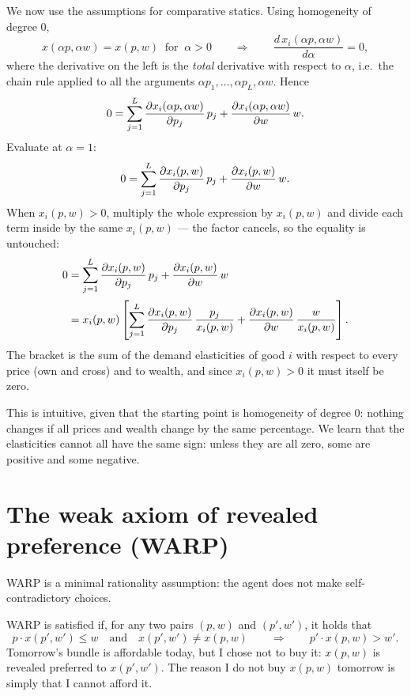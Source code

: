 \documentclass[11pt]{article}
\begin{document}
We now use the assumptions for comparative statics. Using homogeneity of degree 0,
\[ x(\alpha p,\alpha w)=x(p,w)\ \text{ for }\ \alpha>0
   \qquad\Longrightarrow\qquad
   \frac{d\,x_i(\alpha p,\alpha w)}{d\alpha}=0, \]
where the derivative on the left is the \emph{total} derivative with respect to
$\alpha$, i.e.\ the chain rule applied to all the arguments
$\alpha p_1,\dots,\alpha p_L,\alpha w$. Hence
\[ 0=\sum_{j=1}^{L}\frac{\partial x_i(\alpha p,\alpha w)}{\partial p_j}\,p_j
     +\frac{\partial x_i(\alpha p,\alpha w)}{\partial w}\,w . \]
Evaluate at $\alpha=1$:
\[ 0=\sum_{j=1}^{L}\frac{\partial x_i(p,w)}{\partial p_j}\,p_j
     +\frac{\partial x_i(p,w)}{\partial w}\,w . \]
When $x_i(p,w)>0$, multiply the whole expression by $x_i(p,w)$ and divide each term
inside by the same $x_i(p,w)$ --- the factor cancels, so the equality is untouched:
\[
\begin{aligned}
  0&=\sum_{j=1}^{L}\frac{\partial x_i(p,w)}{\partial p_j}\,p_j
      +\frac{\partial x_i(p,w)}{\partial w}\,w\\[2pt]
   &=x_i(p,w)\left[\sum_{j=1}^{L}\frac{\partial x_i(p,w)}{\partial p_j}\,\frac{p_j}{x_i(p,w)}
      +\frac{\partial x_i(p,w)}{\partial w}\,\frac{w}{x_i(p,w)}\right].
\end{aligned}
\]
The bracket is the sum of the demand elasticities of good $i$ with respect to every
price (own and cross) and to wealth, and since $x_i(p,w)>0$ it must itself be zero.

This is intuitive, given that the starting point is homogeneity of degree 0:
nothing changes if all prices and wealth change by the same percentage. We learn
that the elasticities cannot all have the same sign: unless they are all zero, some
are positive and some negative.

\section{The weak axiom of revealed preference (WARP)}

WARP is a minimal rationality assumption: the agent does not make
self-contradictory choices.

WARP is satisfied if, for any two pairs $(p,w)$ and $(p',w')$, it holds that
\[ p\cdot x(p',w')\le w
   \quad\text{and}\quad x(p',w')\ne x(p,w)
   \qquad\Longrightarrow\qquad
   p'\cdot x(p,w)>w' . \]
Tomorrow's bundle is affordable today, but I chose not to buy it: $x(p,w)$ is
revealed preferred to $x(p',w')$. The reason I do not buy $x(p,w)$ tomorrow is
simply that I cannot afford it.
\end{document}
